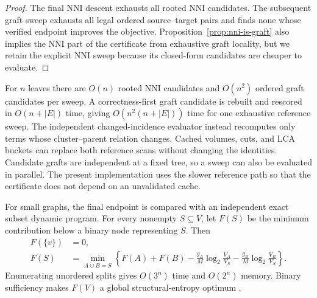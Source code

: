 \begin{proof}
The final NNI descent exhausts all rooted NNI candidates. The subsequent graft
sweep exhausts all legal ordered source--target pairs and finds none whose
verified endpoint improves the objective. Proposition~\ref{prop:nni-is-graft}
also implies the NNI part of the certificate from exhaustive graft locality,
but we retain the explicit NNI sweep because its closed-form candidates are
cheaper to evaluate.
\end{proof}

For $n$ leaves there are $O(n)$ rooted NNI candidates and $O(n^2)$ ordered
graft candidates per sweep. A correctness-first graft candidate is rebuilt
and rescored in $O(n+|E|)$ time, giving
$O(n^2(n+|E|))$ time for one exhaustive reference sweep. The independent
changed-incidence evaluator instead recomputes only terms whose
cluster--parent relation changes. Cached volumes, cuts, and LCA buckets can
replace both reference scans without changing the identities. Candidate
grafts are independent at a fixed tree, so a sweep can also be evaluated in
parallel. The present implementation uses the slower reference path so that
the certificate does not depend on an unvalidated cache.

For small graphs, the final endpoint is compared with an independent exact
subset dynamic program. For every nonempty $S\subseteq V$, let $F(S)$ be the
minimum contribution below a binary node representing $S$. Then
\begin{equation}
\begin{split}
F(\{v\})&=0,\\
F(S)&=\min_{A\mathbin{\dot\cup}B=S}\left\{F(A)+F(B)
-\frac{g_A}{M}\log_2\frac{V_A}{V_S}
-\frac{g_B}{M}\log_2\frac{V_B}{V_S}\right\}.
\end{split}
\label{eq:journal-dp}
\end{equation}
Enumerating unordered splits gives $O(3^n)$ time and $O(2^n)$ memory. Binary
sufficiency makes $F(V)$ a global structural-entropy optimum
\cite{zhang2021supertad,pan2025}.
